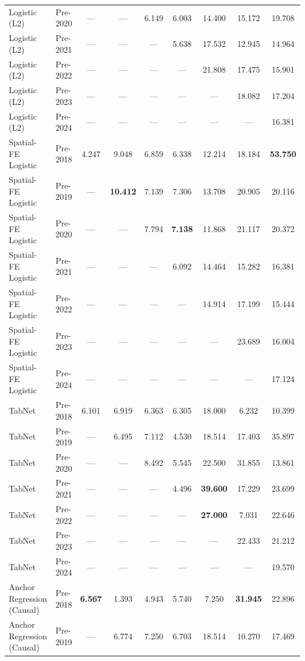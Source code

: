 \begin{table}[htbp]
{\begin{tabular}{l lccccccc}
Logistic (L2) & Pre-2020 & --- & --- & 6.149 & 6.003 & 14.400 & 15.172 & 19.708 \\
Logistic (L2) & Pre-2021 & --- & --- & --- & 5.638 & 17.532 & 12.945 & 14.964 \\
Logistic (L2) & Pre-2022 & --- & --- & --- & --- & 21.808 & 17.475 & 15.901 \\
Logistic (L2) & Pre-2023 & --- & --- & --- & --- & --- & 18.082 & 17.204 \\
Logistic (L2) & Pre-2024 & --- & --- & --- & --- & --- & --- & 16.381 \\
Spatial-FE Logistic & Pre-2018 & 4.247 & 9.048 & 6.859 & 6.338 & 12.214 & 18.184 & \textbf{53.750} \\
Spatial-FE Logistic & Pre-2019 & --- & \textbf{10.412} & 7.139 & 7.306 & 13.708 & 20.905 & 20.116 \\
Spatial-FE Logistic & Pre-2020 & --- & --- & 7.794 & \textbf{7.138} & 11.868 & 21.117 & 20.372 \\
Spatial-FE Logistic & Pre-2021 & --- & --- & --- & 6.092 & 14.464 & 15.282 & 16.381 \\
Spatial-FE Logistic & Pre-2022 & --- & --- & --- & --- & 14.914 & 17.199 & 15.444 \\
Spatial-FE Logistic & Pre-2023 & --- & --- & --- & --- & --- & 23.689 & 16.004 \\
Spatial-FE Logistic & Pre-2024 & --- & --- & --- & --- & --- & --- & 17.124 \\
TabNet & Pre-2018 & 6.101 & 6.919 & 6.363 & 6.305 & 18.000 & 6.232 & 10.399 \\
TabNet & Pre-2019 & --- & 6.495 & 7.112 & 4.530 & 18.514 & 17.403 & 35.897 \\
TabNet & Pre-2020 & --- & --- & 8.492 & 5.545 & 22.500 & 31.855 & 13.861 \\
TabNet & Pre-2021 & --- & --- & --- & 4.496 & \textbf{39.600} & 17.229 & 23.699 \\
TabNet & Pre-2022 & --- & --- & --- & --- & \textbf{27.000} & 7.031 & 22.646 \\
TabNet & Pre-2023 & --- & --- & --- & --- & --- & 22.433 & 21.212 \\
TabNet & Pre-2024 & --- & --- & --- & --- & --- & --- & 19.570 \\
Anchor Regression (Causal) & Pre-2018 & \textbf{6.567} & 1.393 & 4.943 & 5.740 & 7.250 & \textbf{31.945} & 22.896 \\
Anchor Regression (Causal) & Pre-2019 & --- & 6.774 & 7.250 & 6.703 & 18.514 & 10.270 & 17.469 \\

\end{tabular}}
\end{table}
